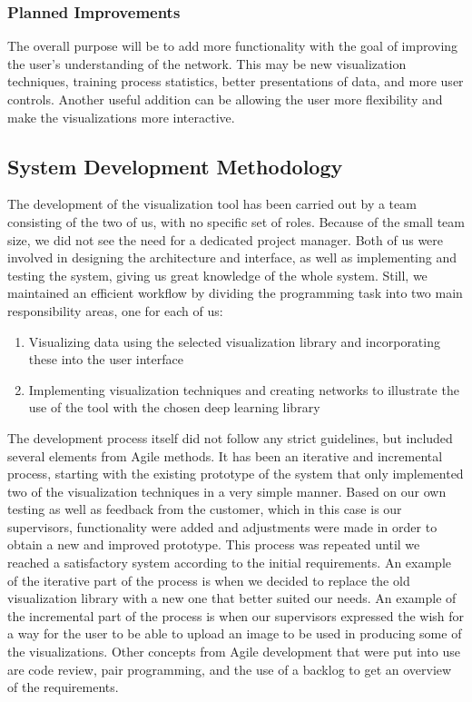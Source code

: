 \subsubsection{Planned Improvements}

The overall purpose will be to add more functionality with the goal of improving the user's understanding of the network. This may be new visualization techniques, training process statistics, better presentations of data, and more user controls. Another useful addition can be allowing the user more flexibility and make the visualizations more interactive.

\subsection{System Development Methodology}

The development of the visualization tool has been carried out by a team consisting of the two of us, with no specific set of roles. Because of the small team size, we did not see the need for a dedicated project manager. Both of us were involved in designing the architecture and interface, as well as implementing and testing the system, giving us great knowledge of the whole system. Still, we maintained an efficient workflow by dividing the programming task into two main responsibility areas, one for each of us:
\begin{enumerate}
    \item Visualizing data using the selected visualization library and incorporating these into the user interface
    \item Implementing visualization techniques and creating networks to illustrate the use of the tool with the chosen deep learning library
\end{enumerate}

\noindent The development process itself did not follow any strict guidelines, but included several elements from Agile methods. It has been an iterative and incremental process, starting with the existing prototype of the system that only implemented two of the visualization techniques in a very simple manner. Based on our own testing as well as feedback from the customer, which in this case is our supervisors, functionality were added and adjustments were made in order to obtain a new and improved prototype. This process was repeated until we reached a satisfactory system according to the initial requirements. An example of the iterative part of the process is when we decided to replace the old visualization library with a new one that better suited our needs. An example of the incremental part of the process is when our supervisors expressed the wish for a way for the user to be able to upload an image to be used in producing some of the visualizations. Other concepts from Agile development that were put into use are code review, pair programming, and the use of a backlog to get an overview of the requirements.

